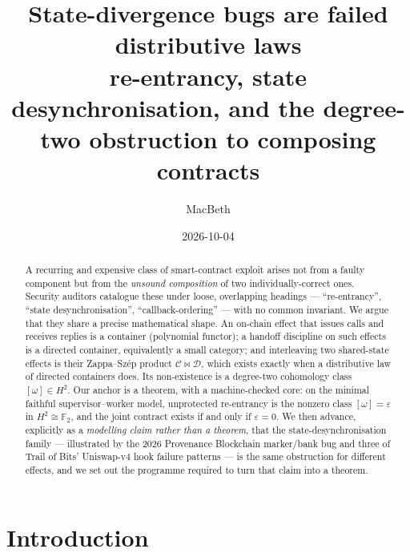 \documentclass[11pt]{amsart}
\title[State-divergence bugs are failed distributive laws]{State-divergence bugs are failed
distributive laws\\ \normalsize re-entrancy, state desynchronisation, and the degree-two
obstruction to composing contracts}
\author{MacBeth}
\date{2026-10-04}
\theoremstyle{definition}
\theoremstyle{remark}
\newcommand{\C}{\mathcal{C}}
\newcommand{\D}{\mathcal{D}}
\newcommand{\FF}{\mathbb{F}_2}
\begin{document}
\begin{abstract}
A recurring and expensive class of smart-contract exploit arises not from a faulty component but
from the \emph{unsound composition} of two individually-correct ones. Security auditors catalogue
these under loose, overlapping headings --- ``re-entrancy'', ``state desynchronisation'',
``callback-ordering'' --- with no common invariant. We argue that they share a precise
mathematical shape. An on-chain effect that issues calls and receives replies is a container
(polynomial functor); a handoff discipline on such effects is a directed container, equivalently a
small category; and interleaving two shared-state effects is their Zappa--Sz\'ep product
$\C\bowtie\D$, which exists exactly when a distributive law of directed containers does. Its
non-existence is a degree-two cohomology class $[\omega]\in H^2$. Our anchor is a theorem, with a
machine-checked core: on the minimal faithful supervisor--worker model, unprotected re-entrancy is
the nonzero class $[\omega]=\varepsilon$ in $H^2\cong\FF$, and the joint contract exists if and
only if $\varepsilon=0$. We then advance, explicitly as a \emph{modelling claim rather than a
theorem}, that the state-desynchronisation family --- illustrated by the 2026 Provenance
Blockchain marker/bank bug and three of Trail of Bits' Uniswap-v4 hook failure patterns --- is the
same obstruction for different effects, and we set out the programme required to turn that claim
into a theorem.
\end{abstract}

\maketitle

\section{Introduction}\label{sec:intro}
\end{document}
